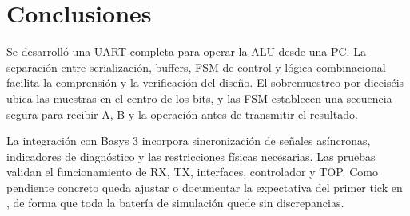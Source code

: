 \documentclass[11pt,a4paper]{article}
\newcommand{\verilog}[1]{\texttt{\detokenize{#1}}}
\begin{document}
\section{Conclusiones}

Se desarrolló una UART completa para operar la ALU desde una PC. La separación entre serialización, buffers, FSM de control y lógica combinacional facilita la comprensión y la verificación del diseño. El sobremuestreo por dieciséis ubica las muestras en el centro de los bits, y las FSM establecen una secuencia segura para recibir A, B y la operación antes de transmitir el resultado.

La integración con Basys 3 incorpora sincronización de señales asíncronas, indicadores de diagnóstico y las restricciones físicas necesarias. Las pruebas validan el funcionamiento de RX, TX, interfaces, controlador y TOP. Como pendiente concreto queda ajustar o documentar la expectativa del primer tick en \verilog{tb_baud_gen}, de forma que toda la batería de simulación quede sin discrepancias.
\end{document}
